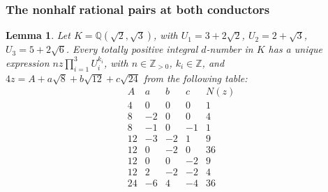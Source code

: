 \documentclass[11pt,reqno]{amsart}
\newtheorem{lemma}[theorem]{Lemma}
\theoremstyle{remark}\newtheorem{remark}[theorem]{Remark}
\numberwithin{equation}{section}
\begin{document}
\subsubsection{The nonhalf rational pairs at both conductors}
\begin{lemma}\label{lem:quartic24-fast}
Let $K=\mathbb Q(\sqrt2,\sqrt3)$, with $U_1=3+2\sqrt2$,
$U_2=2+\sqrt3$, $U_3=5+2\sqrt6$. Every totally positive integral
$d$-number in $K$ has a unique expression
$n z\prod_{i=1}^3 U_i^{k_i}$, with $n\in\mathbb Z_{>0}$,
$k_i\in\mathbb Z$, and $4z=A+a\sqrt8+b\sqrt{12}+c\sqrt{24}$
from the following table:
\[
\begin{array}{rrrr|r}
 A&a&b&c&N(z)\\\hline
 4&0&0&0&1\\
 8&-2&0&0&4\\
 8&-1&0&-1&1\\
 12&-3&-2&1&9\\
 12&0&-2&0&36\\
 12&0&0&-2&9\\
 12&2&-2&-2&4\\
 24&-6&4&-4&36
\end{array}
\]
\end{lemma}
\end{document}
